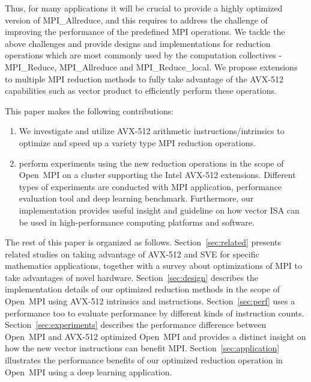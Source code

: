\documentclass[sigconf]{acmart}
\newcommand{\ompi}[0]{Open~MPI\xspace}
\newcommand{\mpi}[0]{\textsc{MPI}\xspace}
\newcommand{\sve}[0]{\textsc{SVE}\xspace}
\begin{document}
Thus, for many applications it will be crucial to provide a highly optimized
version of MPI\_Allreduce, and this requires to address the challenge of improving the performance of the predefined MPI operations. We tackle the above challenges and provide designs and implementations
for reduction operations which are most commonly used by the computation
collectives - MPI\_Reduce, MPI\_Allreduce and MPI\_Reduce\_local.
We propose extensions to multiple \mpi reduction methods to fully take
advantage of the AVX-512 capabilities such as vector product to efficiently
perform these operations.

This paper makes the following contributions:
\begin{enumerate}
  \item We investigate and utilize AVX-512 arithmetic instructions/intrinsics to optimize and
  speed up a variety type \mpi reduction operations.
%
  \item perform experiments using the new reduction operations in the scope
  of \ompi on a cluster supporting the Intel AVX-512 extensions. Different types of
  experiments are conducted with \mpi application, performance evaluation tool and
  deep learning benchmark.
  Furthermore, our implementation provides useful insight and guideline on how vector
  ISA can be used in high-performance computing platforms and software.
\end{enumerate}

The rest of this paper is organized as follows.
Section~\ref{sec:related} presents related studies on taking advantage of AVX-512 and \sve for specific mathematics applications, together with a survey about optimizations of \mpi to take advantages of novel hardware.
Section~\ref{sec:design} describes the implementation details of our optimized reduction methods in the scope of \ompi using AVX-512 intrinsics and instructions.
Section~\ref{sec:perf} uses a performance too to evaluate performance by different kinds of instruction counts.
Section~\ref{sec:experiments} describes the performance difference between
\ompi and AVX-512 optimized \ompi and provides a distinct insight on how the
new vector instructions can benefit \mpi.
Section~\ref{sec:application} illustrates the performance benefits of our
optimized reduction operation in \ompi using a deep learning application.
\end{document}
